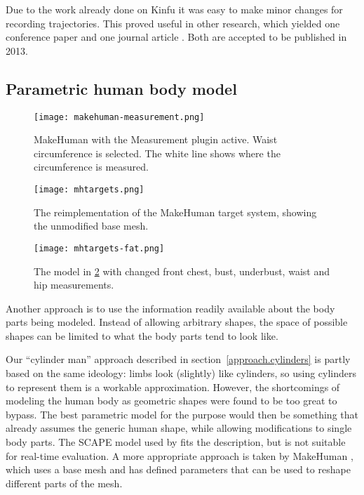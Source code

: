 \newtopic

Due to the work already done on Kinfu it was easy to make minor changes for recording trajectories. This proved useful in other research, which yielded one conference paper \citep*{tykkalavisapp} and one journal article \citep*{tykkalavcir}. Both are accepted to be published in 2013.

\subsection{Parametric human body model} \label{approach.makehuman}

\begin{figure}
    \centering
    \texttt{[image: makehuman-measurement.png]}
    \caption{MakeHuman with the Measurement plugin active. Waist circumference is selected. The white line shows where the circumference is measured.}
    \label{fig:makehuman-measurement}
\end{figure}

\begin{figure}
    \centering
    \texttt{[image: mhtargets.png]}
    \caption{The reimplementation of the MakeHuman target system, showing the unmodified base mesh.}
    \label{fig:mhtargets}
\end{figure}

\begin{figure}
    \centering
    \texttt{[image: mhtargets-fat.png]}
    \caption{The model in \ref{fig:mhtargets} with changed front chest, bust, underbust, waist and hip measurements.}
    \label{fig:mhtargets-fat}
\end{figure}

Another approach is to use the information readily available about the body parts being modeled. Instead of allowing arbitrary shapes, the space of possible shapes can be limited to what the body parts tend to look like.

Our ``cylinder man'' approach described in section~\ref{approach.cylinders} is partly based on the same ideology: limbs look (slightly) like cylinders, so using cylinders to represent them is a workable approximation. However, the shortcomings of modeling the human body as geometric shapes were found to be too great to bypass. The best parametric model for the purpose would then be something that already assumes the generic human shape, while allowing modifications to single body parts. The SCAPE model \citep{anguelov2005scape} used by \citet{weiss2011home} fits the description, but is not suitable for real-time evaluation. A more appropriate approach is taken by MakeHuman \citep{makehuman}, which uses a base mesh and has defined parameters that can be used to reshape different parts of the mesh.

